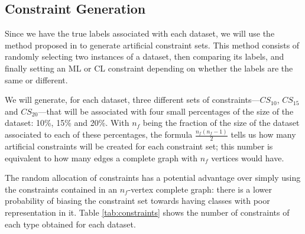 \documentclass[review]{elsarticle}
\begin{document}
\clearpage

\subsection{Constraint Generation} \label{sec:ConstGent}

Since we have the true labels associated with each dataset, we will use the method proposed in \cite{wagstaff2001constrained} to generate artificial constraint sets. This method consists of randomly selecting two instances of a dataset, then comparing its labels, and finally setting an ML or CL constraint depending on whether the labels are the same or different.

We will generate, for each dataset, three different sets of constraints---$CS_{10}$, $CS_{15}$ and $CS_{20}$---that will be associated with four small percentages of the size of the dataset: 10\%, 15\% and 20\%. With $n_f$ being the fraction of the size of the dataset associated to each of these percentages, the formula $\frac{n_f(n_f-1)}{2}$ tells us how many artificial constraints will be created for each constraint set; this number is equivalent to how many edges a complete graph with $n_f$ vertices would have.

The random allocation of constraints has a potential advantage over simply using the constraints contained in an $n_f$-vertex complete graph: there is a lower probability of biasing the constraint set towards having classes with poor representation in it. Table \ref{tab:constraints} shows the number of constraints of each type obtained for each dataset.
\end{document}
